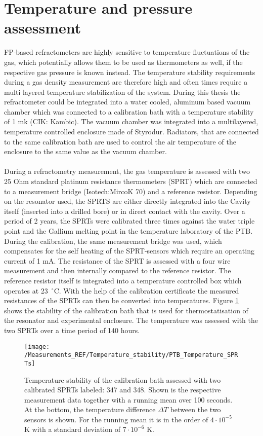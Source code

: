 \section{Temperature and pressure assessment}
FP-based refractometers are highly sensitive to temperature fluctuations of the gas, which potentially allows them to be used as thermometers as well, if the respective gas pressure is known instead. The temperature stability requirements during a gas density measurement are therefore high and often times require a multi layered temperature stabilization of the system. During this thesis the refractometer could be integrated into a water cooled, aluminum based vacuum chamber which was connected to a calibration bath with a temperature stability of 1 mk (CIK: Kambic). The vacuum chamber was integrated into a multilayered, temperature controlled enclosure made of Styrodur. Radiators, that are connected to the same calibration bath are used to control the air temperature of the enclosure to the same value as the vacuum chamber.  \\\\  
During a refractometry measurement, the gas temperature is assessed with two 25 Ohm standard platinum resistance thermometers (SPRT) which are connected to a measurement bridge (Isotech:MircoK 70) and a reference resistor. Depending on the resonator used, the SPRTS are either directly integrated into the Cavity itself (inserted into a drilled bore) or in direct contact with the cavity. Over a period of 2 years, the SPRTs were calibrated three times against the water triple point and the Gallium melting point in the temperature laboratory of the PTB. During the calibration, the same measurement bridge was used, which compensates for the self heating of the SPRT-sensors which require an operating current of 1 mA. The resistance of the SPRT is assessed with a four wire measurement and then internally compared to the reference resistor. The reference resistor itself is integrated into a temperature controlled box which operates at \mbox{23 $^{\circ}$C}. With the help of the calibration certificate the measured resistances of the SPRTs can then be converted into temperatures. Figure \ref{fig:/PTB_Temperature_SPRTs} shows the stability of the calibration bath that is used for thermostatisation of the resonator and experimental enclosure. The temperature was assessed with the two SPRTs over a time period of 140 hours. 
\begin{figure}[H]
	\centering
	\texttt{[image: /Measurements\_REF/Temperature\_stability/PTB\_Temperature\_SPRTs]}
	\caption{Temperature stability of the calibration bath assessed with two calibrated SPRTs labeled: 347 and 348. Shown is the respective measurement data together with a running mean over 100 seconds. At the bottom, the temperature difference $\Delta T$ between the two sensors is shown. For the running mean it is in the order of $4\cdot 10^{-5}$ K with a standard deviation of  $7\cdot 10^{-6}$ K. }
	\label{fig:/PTB_Temperature_SPRTs}
\end{figure}
